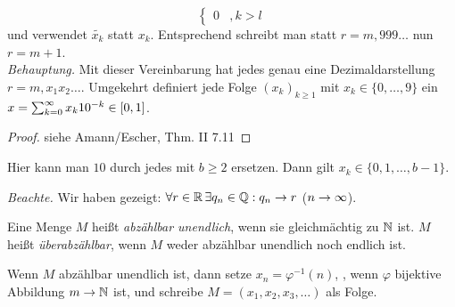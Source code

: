 \documentclass[12pt]{scrreprt}
\begin{document}
\begin{bsp}[Dezimaldarstellung]
\[\begin{cases}
    0     &, k>l
  \end{cases}
  \] und verwendet $\tilde{x_k}$ statt $x_k$. Entsprechend schreibt
  man statt $r=m{,}999\dotsc$ nun $r=m+1$.\\
  \emph{Behauptung.} Mit dieser Vereinbarung hat jedes  genau
  eine Dezimaldarstellung $r=m{,}x_1x_2\dotsc$. Umgekehrt definiert
  jede Folge $(x_k)_{k\ge1}$ mit $x_k\in\{0,\dotsc,9\}$ ein
  $x=\sum_{k=0}^\infty x_k10^{-k}\in[0,1]$.
  \begin{proof} siehe Amann/Escher, Thm. II 7.11 \end{proof}
  \begin{bem*}
    Hier kann man $10$ durch jedes  mit $b\ge2$ ersetzen. Dann
    gilt $x_k\in\{0,1,\dotsc,b-1\}$.
  \end{bem*}
  \noindent \emph{Beachte.} Wir haben gezeigt: $\forall r\in\mathbb{R} \, \exists
  q_n\in\mathbb{Q}: q_n\to r$ ($n\rightarrow\infty$).
\end{bsp}

\begin{dfn}
  \label{dfn:reihen.abzaehlbar}
  Eine Menge $M$ heißt \emph{abzählbar unendlich}, wenn sie
  gleichmächtig zu $\mathbb{N}$ ist. $M$ heißt \emph{überabzählbar}, wenn
  $M$ weder abzählbar unendlich noch endlich ist.
\end{dfn}
\begin{bem*}
  Wenn $M$ abzählbar unendlich ist, dann setze $x_n=\varphi^{-1}(n)$,
  , wenn $\varphi$ bijektive Abbildung $m\rightarrow\mathbb{N}$ ist, und
  schreibe $M=(x_1,x_2,x_3,\dotsc)$ als Folge.
\end{bem*}
\end{document}
